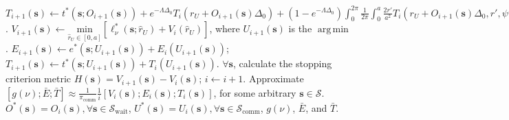 \documentclass[12pt, draftcls, onecolumn]{IEEEtran}
\theoremstyle{plain}
\theoremstyle{definition}
\theoremstyle{remark}
\DeclareMathOperator*{\argmin}{arg\,min}
\begin{document}
\begin{algorithm}[t]
\begin{algorithmic}[1]
        		\vspace{0.1cm}
        		\State $T_{i{+}1}(\mathbf{s}){\gets}t^{*}(\mathbf{s};O_{i{+}1}(\mathbf{s})){+}e^{-\Lambda\Delta_{0}}T_{i}(r_{U}{+}O_{i{+}1}(\mathbf{s})\Delta_{0}){+}\left(1{-}e^{-\Lambda\Delta_{0}}\right)\int_{0}^{2\pi}\frac{1}{2\pi}\int_{0}^{a}\frac{2r'}{a^{2}}T_{i}(r_{U}{+}O_{i{+}1}(\mathbf{s})\Delta_{0},r',\psi')\mathrm{d}r'\mathrm{d}\psi'$.
        		\vspace{0.1cm}
        	\EndFor
        	\vspace{0.1cm}
        	    \vspace{0.1cm}
        		\State $V_{i{+}1}(\mathbf{s}){\gets}\underset{\hat{r}_{U}{\in}[0,a]}{\mathrm{min}}\left[\ell_{\nu}^{*}(\mathbf{s};\hat{r}_{U}){+}V_{i}(\hat{r}_{U})\right]$, where $U_{i{+}1}(\mathbf{s})$ is the $\argmin$.
        		\vspace{0.1cm}
        		\State $E_{i{+}1}(\mathbf{s}){\gets}e^{*}(\mathbf{s};U_{i{+}1}(\mathbf{s})){+}E_{i}(U_{i{+}1}(\mathbf{s}))$; $T_{i{+}1}(\mathbf{s}){\gets}t^{*}(\mathbf{s};U_{i{+}1}(\mathbf{s})){+}T_{i}(U_{i{+}1}(\mathbf{s}))$.
        		\vspace{0.1cm}
        	\EndFor
        	\vspace{0.1cm}
        	\State ${\forall}\mathbf{s}$, calculate the stopping criterion metric $H(\mathbf{s}){=}V_{i{+}1}(\mathbf{s}){-}V_{i}(\mathbf{s})$; $i{\gets}i{+}1$.
        	\vspace{0.1cm}
    \vspace{0.1cm}
    \State Approximate $\left[g(\nu);\bar{E};\bar{T}\right]{\approx}\frac{1}{\pi_{\mathrm{comm}}}\frac{1}{i}\left[V_{i}(\mathbf{s});E_{i}(\mathbf{s});T_{i}(\mathbf{s})\right]$, for some arbitrary $\mathbf{s}{\in}\mathcal{S}$.
    \vspace{0.1cm}\\
    \Return $O^{*}(\mathbf{s})=O_{i}(\mathbf{s}),{\forall}\mathbf{s}{\in}\mathcal{S}_{\mathrm{wait}}$, $U^{*}(\mathbf{s}){=}U_{i}(\mathbf{s}),{\forall}\mathbf{s}{\in} \mathcal{S}_{\mathrm{comm}}$, $g(\nu)$, $\bar{E}$, and $\bar{T}$.
    \end{algorithmic}
\end{algorithm}
\end{document}
